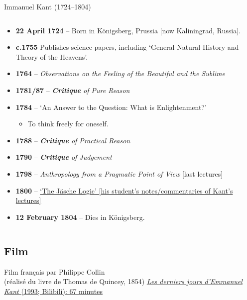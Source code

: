 \documentclass[10pt,letterpaper]{beamer}
\begin{document}
\begin{frame}{Immanuel Kant (1724–1804)}
\begin{columns}
   \vspace{-0.5em}
\begin{small}
    \begin{itemize}\itemsep-0.1em
        \item<2-> \textbf{22 April 1724} – Born in Königsberg, Prussia [now Kaliningrad, Russia].
        \item<3-> \textbf{c.1755} Publishes science papers, including `General Natural History and Theory of the Heavens'.
        \item<3-> \textbf{1764} – \textit{Observations on the Feeling of the Beautiful and the Sublime}
        \item<4-> \textbf{1781/87} – \textit{\textbf{Critique} of Pure Reason}
        \item<5-> \textbf{1784} – `An Answer to the Question: What is \alert{Enlightenment}?'
            \begin{itemize}\vspace{-0.2em}
                \item[\PHram] To think freely for oneself. 
            \end{itemize}
        \item<4-> \textbf{1788} – \textit{\textbf{Critique} of Practical Reason} %
        \item<4-> \textbf{1790} – \textit{\textbf{Critique} of Judgement} %
        \item<6-> \textbf{1798} – \textit{Anthropology from a Pragmatic Point of View} [last lectures]
        \item<7-> \textbf{1800} – \href{https://philpapers.org/rec/KANTJL}{`\underline{The Jäsche Logic}' [his student's notes/commentaries of Kant's lectures]} %
        \item<8-> \textbf{12 February 1804} – Dies in Königsberg.
    \end{itemize}
\end{small}
\end{columns} 
\end{frame}

\subsection{Film}
\begin{frame}{Film français par Philippe Collin\\(réalisé du livre de Thomas de Quincey, 1854)}
\centering
\vfill
   \href{https://www.bilibili.com/video/BV1NR4y1c7Bn/?spm_id_from=333.337.search-card.all.click}{\underline{\textit{Les derniers jours d’Emmanuel Kant} (1993; Bilibili)}: 67 minutes} %
\end{frame} %
\end{document}

